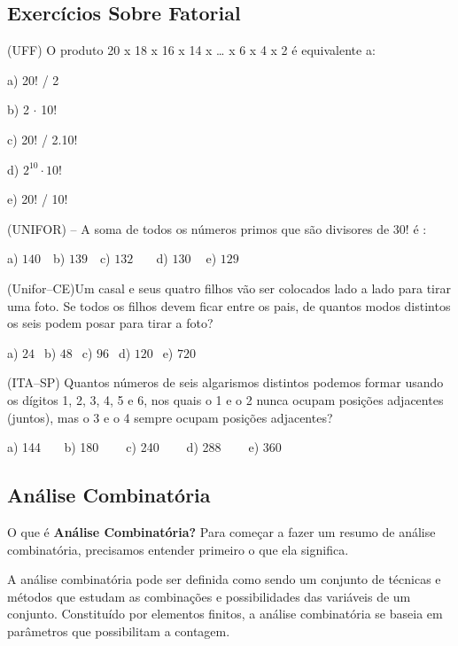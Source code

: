 \begin{multicols*}{2}
\begin{enumerate}
	\end{enumerate}


	\subsection{Exercícios Sobre Fatorial}

		\setcounter{numexercicio}{0}
		\execnum  (UFF) O produto 20 x 18 x 16 x 14 x … x 6 x 4 x 2 é equivalente a:

		      a) 20! / 2

		      b) 2 $\cdot$ 10!

		      c) 20! / 2.10!

		      d) $2^{10} \cdot 10!$

		      e) 20! / 10!

		\execnum  (UNIFOR) – A soma de todos os números primos que são divisores de 30! é :

		      a) $140 \ \ \ $ b) $139 \ \ \ $ c) $132 \ \ \ \ \ \ \ $ d) $130 \ \ \ \ $ e) $129 \ \ $

		\execnum  (Unifor–CE)Um casal e seus quatro filhos vão ser colocados lado a lado para tirar uma foto. Se todos os filhos devem ficar entre os pais, de quantos modos distintos os seis podem posar para tirar a foto?

		      a) $24 \ \ $ b) $48 \ \ $ c) $96 \ \ $ d) $120 \ \ $ e) $720 \ \ $

		\execnum  (ITA–SP) Quantos números de seis algarismos distintos podemos formar usando os dígitos 1, 2, 3, 4, 5 e 6, nos quais o 1 e o 2 nunca ocupam posições adjacentes (juntos), mas o 3 e o 4 sempre ocupam posições adjacentes?

		      a) 144$ \ \ \ \ \ \ \ $ b) 180 $ \ \ \ \ \ \ \ $ c) 240 $ \ \ \ \ \ \ \ $ d) 288 $ \ \ \ \ \ \ \ $ e) 360


	\subsection{Análise Combinatória}


	O que é \textbf{Análise Combinatória?}
	Para começar a fazer um resumo de análise combinatória, precisamos entender primeiro o que ela significa.

	A análise combinatória pode ser definida como sendo um conjunto de técnicas e métodos que estudam as combinações e possibilidades das variáveis de um conjunto. Constituído por elementos finitos, a análise combinatória se baseia em parâmetros que possibilitam a contagem.


\end{multicols*}
